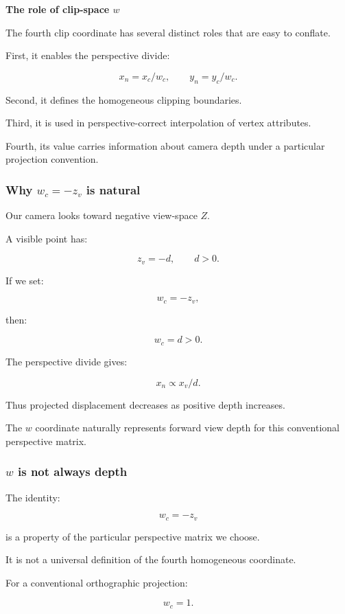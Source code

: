 \textbf{The role of clip-space \(w\)}

The fourth clip coordinate has several distinct roles that are easy to conflate.

First, it enables the perspective divide:

\[
 x_n=x_c/w_c, \qquad y_n=y_c/w_c.
\]

Second, it defines the homogeneous clipping boundaries.

Third, it is used in perspective-correct interpolation of vertex attributes.

Fourth, its value carries information about camera depth under a particular projection convention.

\subsubsection{\texorpdfstring{Why \(w_c=-z_v\) is natural}{Why w\_c=-z\_v is natural}}\label{why-w_c-z_v-is-natural}

Our camera looks toward negative view-space \(Z\).

A visible point has:

\[
 z_v=-d, \qquad d>0.
\]

If we set:

\[
 w_c=-z_v,
\]

then:

\[
 w_c=d>0.
\]

The perspective divide gives:

\[
 x_n\propto x_v/d.
\]

Thus projected displacement decreases as positive depth increases.

The \(w\) coordinate naturally represents forward view depth for this conventional perspective matrix.

\subsubsection{\texorpdfstring{\(w\) is not always depth}{w is not always depth}}\label{w-is-not-always-depth}

The identity:

\[
 w_c=-z_v
\]

is a property of the particular perspective matrix we choose.

It is not a universal definition of the fourth homogeneous coordinate.

For a conventional orthographic projection:

\[
 w_c=1.
\]

